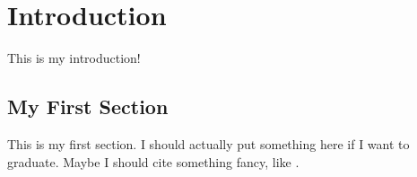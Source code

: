 \chapter{Introduction}
\label{chap:intro}

This is my introduction!

\section{My First Section}

This is my first section. I should actually put something here if I
want to graduate. Maybe I should cite something fancy, like
\citep{chandra39}. 
